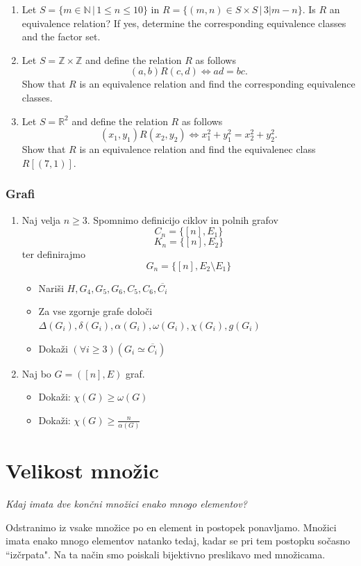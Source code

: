 \documentclass[11pt,paper=b5,footinclude,headinclude]{scrbook} %
\begin{document}
\begin{enumerate}
\item Let $S= \{m\in \mathbb{N}\,|\, 1\leq n \leq 10\}$ in $R=\{(m,n)\in S\times S\,|\, 3|m-n\}$.
Is $R$ an equivalence relation? If yes, determine the corresponding equivalence classes and the factor set.

\item Let $S = \mathbb{Z}\times \mathbb{Z}$ and define the relation $R$ as follows
$$(a,b)R(c,d)\Leftrightarrow ad = bc.$$
Show that $R$ is an equivalence relation  and find the corresponding equivalence classes.

\item Let  $S =  \mathbb{R}^2$ and define the relation $R$ as follows
$$(x_1,y_1)R(x_2,y_2)\Leftrightarrow x_1^2 + y_1^2 = x_2^2 + y_2^2.$$
Show that $R$ is an equivalence relation  and find the equivalenec class $R[(7,1)]$.



\end{enumerate}
\subsection{Grafi}
\begin{enumerate}
\item Naj velja $n\ge 3$. Spomnimo definicijo ciklov in polnih grafov
\[C_{n}=\{[n], E_{1}\}\]
\[K_{n}=\{[n], E_{2}\}\]
ter definirajmo 
\[G_{n}=\{[n], E_{2} \setminus E_{1}\}\]
\begin{itemize}
    \item Nariši \(H, G_{4}, G_{5}, G_{6}, C_{5}, C_{6}, \overline{C_{i}}\)
    \item Za  vse zgornje grafe določi \(\Delta(G_{i}), \delta(G_{i}), \alpha(G_{i}), \omega(G_{i}), \chi(G_{i}), g(G_{i})\)
    \item
Dokaži \((\forall i \geq 3) (G_{i} \simeq \overline{C_{i}})\)
\end{itemize}


\item
Naj bo \(G = ([n], E)\) graf.
\begin{itemize}
\item
Dokaži: \(\chi (G) \geq \omega (G)\)

\item
Dokaži: \(\chi (G) \geq \frac{n}{\alpha(G)}\)
\end{itemize}

\end{enumerate}

\chapter{Velikost množic}
{\em Kdaj imata dve končni množici enako mnogo elementov?

Odstranimo iz vsake množice po en element in postopek ponavljamo. Množici
imata enako mnogo elementov natanko tedaj, kadar se pri tem postopku sočasno ``izčrpata".
Na ta način smo poiskali bijektivno preslikavo med množicama.}
\end{document}
